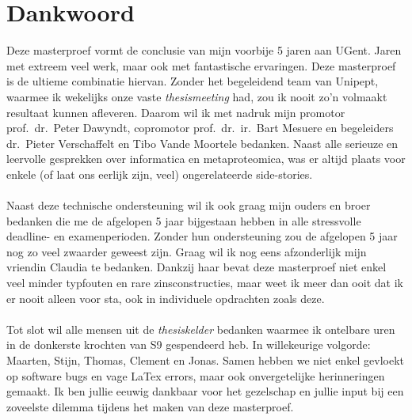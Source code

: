 \chapter*{Dankwoord}\label{ch:dankwoord}
Deze masterproef vormt de conclusie van mijn voorbije 5 jaren aan UGent.
Jaren met extreem veel werk, maar ook met fantastische ervaringen.
Deze masterproef is de ultieme combinatie hiervan.
Zonder het begeleidend team van Unipept, waarmee ik wekelijks onze vaste \textit{thesismeeting} had, zou ik nooit zo'n volmaakt resultaat kunnen afleveren.
Daarom wil ik met nadruk mijn promotor prof.\ dr.\ Peter Dawyndt, copromotor prof.\ dr.\ ir.\ Bart Mesuere en begeleiders dr.\ Pieter Verschaffelt en Tibo Vande Moortele bedanken.
Naast alle serieuze en leervolle gesprekken over informatica en metaproteomica, was er altijd plaats voor enkele (of laat ons eerlijk zijn, veel) ongerelateerde side-stories.
\\ \\
Naast deze technische ondersteuning wil ik ook graag mijn ouders en broer bedanken die me de afgelopen 5 jaar bijgestaan hebben in alle stressvolle deadline- en examenperioden.
Zonder hun ondersteuning zou de afgelopen 5 jaar nog zo veel zwaarder geweest zijn.
Graag wil ik nog eens afzonderlijk mijn vriendin Claudia te bedanken.
Dankzij haar bevat deze masterproef niet enkel veel minder typfouten en rare zinsconstructies, maar weet ik meer dan ooit dat ik er nooit alleen voor sta, ook in individuele opdrachten zoals deze.
\\ \\
Tot slot wil alle mensen uit de \textit{thesiskelder} bedanken waarmee ik ontelbare uren in de donkerste krochten van S9 gespendeerd heb.
In willekeurige volgorde: Maarten, Stijn, Thomas, Clement en Jonas.
Samen hebben we niet enkel gevloekt op software bugs en vage LaTex errors, maar ook onvergetelijke herinneringen gemaakt.
Ik ben jullie eeuwig dankbaar voor het gezelschap en jullie input bij een zoveelste dilemma tijdens het maken van deze masterproef.
